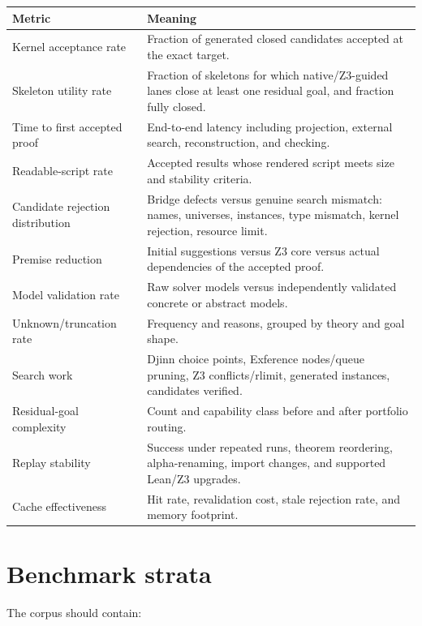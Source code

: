 \documentclass[11pt,letterpaper,openany]{report}
\begin{document}
\begin{longtable}{@{}L{0.25\textwidth}L{0.65\textwidth}@{}}
\toprule
\textbf{Metric} & \textbf{Meaning} \\
\midrule
\endhead
Kernel acceptance rate & Fraction of generated closed candidates accepted at the exact target. \\
Skeleton utility rate & Fraction of skeletons for which native/Z3-guided lanes close at least one residual goal, and fraction fully closed. \\
Time to first accepted proof & End-to-end latency including projection, external search, reconstruction, and checking. \\
Readable-script rate & Accepted results whose rendered script meets size and stability criteria. \\
Candidate rejection distribution & Bridge defects versus genuine search mismatch: names, universes, instances, type mismatch, kernel rejection, resource limit. \\
Premise reduction & Initial suggestions versus Z3 core versus actual dependencies of the accepted proof. \\
Model validation rate & Raw solver models versus independently validated concrete or abstract models. \\
Unknown/truncation rate & Frequency and reasons, grouped by theory and goal shape. \\
Search work & Djinn choice points, Exference nodes/queue pruning, Z3 conflicts/rlimit, generated instances, candidates verified. \\
Residual-goal complexity & Count and capability class before and after portfolio routing. \\
Replay stability & Success under repeated runs, theorem reordering, alpha-renaming, import changes, and supported Lean/Z3 upgrades. \\
Cache effectiveness & Hit rate, revalidation cost, stale rejection rate, and memory footprint. \\
\bottomrule
\end{longtable}

\section{Benchmark strata}

The corpus should contain:
\end{document}
